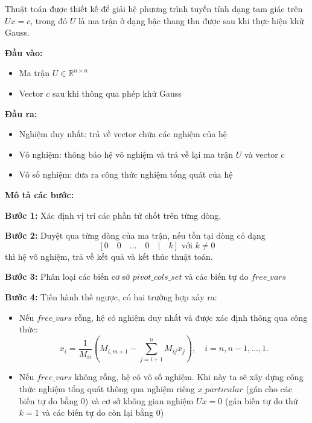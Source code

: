 \documentclass[a4paper]{article}
\begin{document}
Thuật toán được thiết kế để giải hệ phương trình tuyến tính dạng tam giác trên $Ux = c$, trong đó $U$ là ma trận ở dạng bậc thang thu được sau khi thực hiện khử Gauss.

\textbf{Đầu vào: } 

\begin{itemize}
    \item Ma trận $U \in \mathbb{R}^{n \times n}$
    \item Vector $c$ sau khi thông qua phép khử Gauss
\end{itemize}

\textbf{Đầu ra: }
\begin{itemize}
    \item Nghiệm duy nhất: trả về vector chứa các nghiệm của hệ
    \item Vô nghiệm: thông báo hệ vô nghiệm và trả về lại ma trận $U$ và vector $c$
    \item Vô số nghiệm: đưa ra công thức nghiệm tổng quát của hệ
\end{itemize}

\textbf{Mô tả các bước: }

\textbf{Bước 1: } Xác định vị trí các phần tử chốt trên từng dòng.

\textbf{Bước 2: } Duyệt qua từng dòng của ma trận, nếu tồn tại dòng có dạng
\[[0 \quad 0 \quad ... \quad 0 \quad | \quad k] \text{ với } k \neq 0\]
thì hệ vô nghiệm, trả về kết quả và kết thúc thuật toán.

\textbf{Bước 3: } Phân loại các biến cơ sở $pivot\_cols\_set$ và các biến tự do $free\_vars$

\textbf{Bước 4: } Tiến hành thế ngược, có hai trường hợp xảy ra:

\begin{itemize}
    \item Nếu $free\_vars$ rỗng, hệ có nghiệm duy nhất và được xác định thông qua công thức:
\[x_i = \frac{1}{M_{ii}} \left( M_{i,m+1} - \sum_{j=i+1}^{n} M_{ij} x_j \right), \quad i = n, n-1, \dots, 1.\]

    \item Nếu $free\_vars$ không rỗng, hệ có vô số nghiệm. Khi này ta sẽ xây dựng công thức nghiệm tổng quát thông qua nghiệm riêng $x\_particular$ (gán cho các biến tự do bằng 0) và cơ sở không gian nghiệm $Ux = 0$ (gán biến tự do thứ $k = 1$ và các biến tự do còn lại bằng 0) 
\end{itemize}
\end{document}
